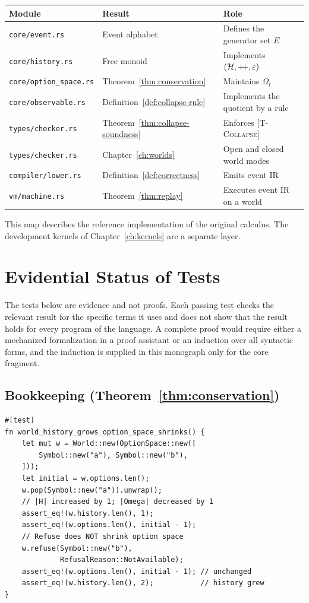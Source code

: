 \documentclass[12pt,oneside,openany]{book}
\theoremstyle{spherepop}
\theoremstyle{remarkstyle}
\newcommand{\hconcat}{\mathbin{+\mkern-5mu+}}
\newcommand{\calH}{\mathcal{H}}
\begin{document}
\begin{center}
\small
\begin{tabular}{p{}p{}p{}}
\toprule
Module & Result & Role \\
\midrule
\texttt{core/\allowbreak event.rs} & Event alphabet & Defines the generator set $E$ \\
\texttt{core/\allowbreak history.rs} & Free monoid & Implements $(\calH,\hconcat,\varepsilon)$ \\
\texttt{core/\allowbreak option\_\allowbreak space.rs} & Theorem~\ref{thm:conservation} & Maintains $\Omega_t$ \\
\texttt{core/\allowbreak observable.rs} & Definition~\ref{def:collapse-rule} & Implements the quotient by a rule \\
\texttt{types/\allowbreak checker.rs} & Theorem~\ref{thm:collapse-soundness} & Enforces \textsc{[T-Collapse]} \\
\texttt{types/\allowbreak checker.rs} & Chapter~\ref{ch:worlds} & Open and closed world modes \\
\texttt{compiler/\allowbreak lower.rs} & Definition~\ref{def:correctness} & Emits event IR \\
\texttt{vm/\allowbreak machine.rs} & Theorem~\ref{thm:replay} & Executes event IR on a world \\
\bottomrule
\end{tabular}
\end{center}

This map describes the reference implementation of the original calculus. The development kernels of Chapter~\ref{ch:kernels} are a separate layer.

\section{Evidential Status of Tests}

The tests below are evidence and not proofs. Each passing test checks the relevant result for the specific terms it uses and does not show that the result holds for every program of the language. A complete proof would require either a mechanized formalization in a proof assistant or an induction over all syntactic forms, and the induction is supplied in this monograph only for the core fragment.

\subsection*{Bookkeeping (Theorem~\ref{thm:conservation})}
\begin{lstlisting}
#[test]
fn world_history_grows_option_space_shrinks() {
    let mut w = World::new(OptionSpace::new([
        Symbol::new("a"), Symbol::new("b"),
    ]));
    let initial = w.options.len();
    w.pop(Symbol::new("a")).unwrap();
    // |H| increased by 1; |Omega| decreased by 1
    assert_eq!(w.history.len(), 1);
    assert_eq!(w.options.len(), initial - 1);
    // Refuse does NOT shrink option space
    w.refuse(Symbol::new("b"),
             RefusalReason::NotAvailable);
    assert_eq!(w.options.len(), initial - 1); // unchanged
    assert_eq!(w.history.len(), 2);           // history grew
}
\end{lstlisting}
\end{document}
